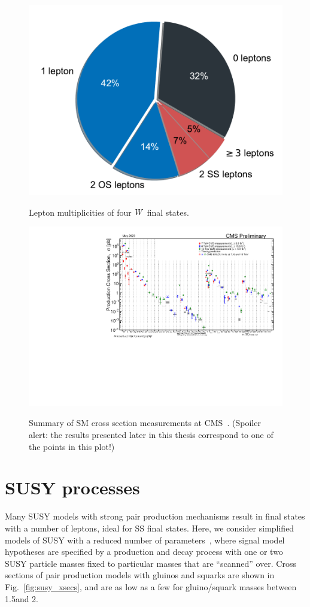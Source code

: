 \begin{figure}[!hbtp]
\centering
\includegraphics[width=.50\textwidth]{figs/misc/fourtopdecay_pie.pdf} \\
\caption{Lepton multiplicities of four $W$ final states.}
\label{fig:fourtoppie}
\end{figure}

\begin{figure}[!hbtp]
\centering
\includegraphics[width=.95\textwidth]{figs/misc/sm_xsecs.pdf} \\
\caption{Summary of SM cross section measurements at CMS~\cite{CMS:SMxsecs}.
(Spoiler alert: the results presented later in this thesis correspond to one
of the points in this plot!)
}
\label{fig:SMxsecs}
\end{figure}

\FloatBarrier

\section{SUSY processes}


Many SUSY models with strong pair production mechanisms result in
final states with a number of leptons, ideal for SS final states.
Here, we consider simplified models of SUSY with a reduced number of
parameters~\cite{ref:CMS:SMS}, where signal model hypotheses are specified
by a production and decay process with one or two SUSY particle masses
fixed to particular masses that are ``scanned'' over.
Cross sections of pair production models with gluinos and squarks 
are shown in Fig.~\ref{fig:susy_xsecs}, and are as low as a few \fbinv 
for gluino/squark masses between 1.5\TeV and 2\TeV.

